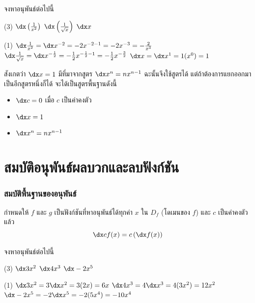 \begin{frame}[t]
\begin{ex}
จงหาอนุพันธ์ต่อไปนี้
\begin{tasks}(3)
\task $\dx \left(\frac{1}{x^2}\right)$
\task $\dx \left(\frac{1}{\sqrt{x}}\right)$
\task $\dx x$
\end{tasks}
\end{ex}
\begin{sol}
\begin{tasks}(1)
\task $\dx \frac{1}{x^2} = \dx x^{-2} = -2x^{-2-1} = -2x^{-3} = -\frac{2}{x^3}$
\task $\dx \frac{1}{\sqrt{x}} = \dx x^{-\frac{1}{2}} = -\frac{1}{2} x^{-\frac{1}{2} - 1} = - \frac{1}{2} x^{-\frac{3}{2}}$
\task $\dx x = \dx x^1 = 1(x^0) = 1$
\end{tasks}
\end{sol}
\end{frame}

\begin{frame}{}
\begin{remark}{}
สังเกตว่า $\dx x = 1$ มีที่มาจากสูตร $\dx x^n = nx^{n-1}$ ฉะนั้นจึงใช้สูตรได้ แต่ถ้าต้องการแยกออกมาเป็นอีกสูตรหนึ่งก็ได้ จะได้เป็นสูตรพื้นฐานดังนี้
\begin{itemize}
\item $\dx c = 0$ เมื่อ $c$ เป็นค่าคงตัว
\item $\dx x = 1$
\item $\dx x^n = nx^{n-1}$
\end{itemize}
\end{remark}
\end{frame}

\section[บวกและลบ]{สมบัติอนุพันธ์ผลบวกและลบฟังก์ชัน}
\frame{\sectionpage}

\begin{frame}
\frametitle{สมบัติพื้นฐานของอนุพันธ์}
\begin{prop}{}{}
กำหนดให้ $f$ และ $g$ เป็นฟังก์ชันที่หาอนุพันธ์ได้ทุกค่า $x$ ใน $D_f$ (โดเมนของ $f$) และ $c$ เป็นค่าคงตัว แล้ว \pa
\begin{equation}
\dx cf(x) = c \left( \dx f(x)\right)
\end{equation}
\end{prop}
\end{frame}


\begin{frame}[t]
\begin{ex}
จงหาอนุพันธ์ต่อไปนี้
\begin{tasks}(3) 
\task $\dx 3x^2$
\task $\dx 4x^3$
\task $\dx -2x^5$
\end{tasks}
\end{ex}
\begin{sol}
\begin{tasks}(1) 
\task $\dx 3x^2 = 3 \dx x^2 = 3 (2x) = 6x$
\task $\dx 4x^3 = 4 \dx x^3 = 4(3x^2) = 12x^2$
\task $\dx -2x^5 = -2 \dx x^5 = -2(5x^4) = -10x^4$
\end{tasks}
\end{sol}
\end{frame}

